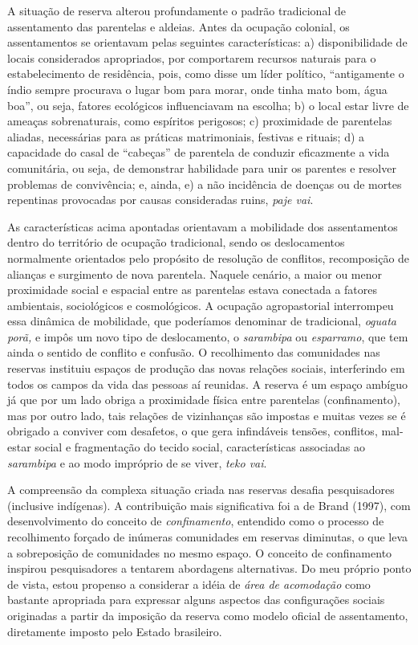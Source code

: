 A situação de reserva alterou profundamente o padrão tradicional de
assentamento das parentelas e aldeias. Antes da ocupação colonial, os
assentamentos se orientavam pelas seguintes características: a)
disponibilidade de locais considerados apropriados, por comportarem
recursos naturais para o estabelecimento de residência, pois, como disse
um líder político, ``antigamente o índio sempre procurava o lugar bom
para morar, onde tinha mato bom, água boa'', ou seja, fatores ecológicos
influenciavam na escolha; b) o local estar livre de ameaças
sobrenaturais, como espíritos perigosos; c) proximidade de parentelas
aliadas, necessárias para as práticas matrimoniais, festivas e rituais;
d) a capacidade do casal de ``cabeças'' de parentela de conduzir
eficazmente a vida comunitária, ou seja, de demonstrar habilidade para
unir os parentes e resolver problemas de convivência; e, ainda, e) a não
incidência de doenças ou de mortes repentinas provocadas por causas
consideradas ruins, \emph{paje vai}.

As características acima apontadas orientavam a mobilidade dos
assentamentos dentro do território de ocupação tradicional, sendo os
deslocamentos normalmente orientados pelo propósito de resolução de
conflitos, recomposição de alianças e surgimento de nova parentela.
Naquele cenário, a maior ou menor proximidade social e espacial entre as
parentelas estava conectada a fatores ambientais, sociológicos e
cosmológicos. A ocupação agropastorial interrompeu essa dinâmica de
mobilidade, que poderíamos denominar de tradicional, \emph{oguata porã,}
e impôs um novo tipo de deslocamento, o \emph{sarambipa} ou
\emph{esparramo}, que tem ainda o sentido de conflito e confusão. O
recolhimento das comunidades nas reservas instituiu espaços de produção
das novas relações sociais, interferindo em todos os campos da vida das
pessoas aí reunidas. A reserva é um espaço ambíguo já que por um lado
obriga a proximidade física entre parentelas (confinamento), mas por
outro lado, tais relações de vizinhanças são impostas e muitas vezes se
é obrigado a conviver com desafetos, o que gera infindáveis tensões,
conflitos, mal-estar social e fragmentação do tecido social,
características associadas ao \emph{sarambipa} e ao modo impróprio de se
viver, \emph{teko vai}.

A compreensão da complexa situação criada nas reservas desafia
pesquisadores (inclusive indígenas). A contribuição mais significativa
foi a de Brand (1997), com desenvolvimento do conceito de
\emph{confinamento}, entendido como o processo de recolhimento forçado
de inúmeras comunidades em reservas diminutas, o que leva a sobreposição
de comunidades no mesmo espaço. O conceito de confinamento inspirou
pesquisadores a tentarem abordagens alternativas. Do meu próprio ponto
de vista, estou propenso a considerar a idéia de \emph{área de
acomodação} como bastante apropriada para expressar alguns aspectos das
configurações sociais originadas a partir da imposição da reserva como
modelo oficial de assentamento, diretamente imposto pelo Estado
brasileiro.

